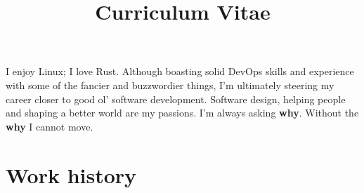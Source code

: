 \documentclass[11pt,a4paper,sans]{moderncv} %
\title{Curriculum Vitae}
\begin{document}









\makecvtitle %


I enjoy Linux; I love Rust. Although boasting solid DevOps skills and experience with some of the fancier
and buzzwordier things, I'm ultimately steering my career closer to good ol' software development.
Software design, helping people and shaping a better world are my passions. I'm always asking
\textbf{why}. Without the \textbf{why} I cannot move.



\section{Work history}
\end{document}
